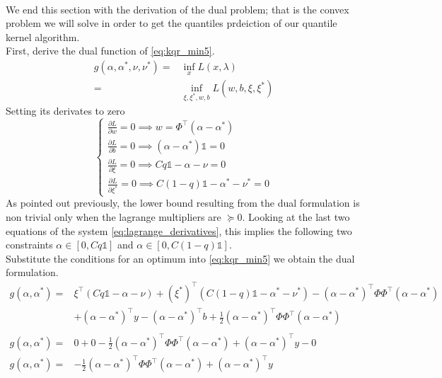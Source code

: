 \\
We end this section with the derivation of the dual problem; that is the convex problem we will solve in order to get the quantiles prdeiction of our quantile kernel algorithm.
\\
First, derive the dual function of \ref{eq:kqr_min5}.
\begin{equation}
    \begin{aligned}
        g(\alpha, \alpha^*, \nu, \nu^*)=& \inf_x L(x,\lambda)\\
    = & \inf_{\xi, \xi^*, w, b} L(w,b,\xi,\xi^*)
\end{aligned}
\end{equation}
Setting its derivates to zero
\begin{equation}\label{eq:lagrange_derivatives}
    \begin{cases}
        \frac{\partial L}{\partial w}=0 \implies w=\Phi^\intercal(\alpha-\alpha^*)
        \\
        \frac{\partial L}{\partial b}=0 \implies (\alpha-\alpha^*)\mathbb{1}=0
        \\
        \frac{\partial L}{\partial \xi}=0 \implies Cq \mathbb{1}-\alpha- \nu=0
        \\
        \frac{\partial L}{\partial \xi^*}=0 \implies C(1-q)\mathbb{1} -\alpha^* -\nu^*=0
    \end{cases}
\end{equation}
As pointed out previously, the lower bound resulting from the dual formulation is non trivial only when the lagrange multipliers are $\succeq 0$. Looking at the last two equations of the system \ref{eq:lagrange_derivatives}, this implies the following two constraints $\alpha \in [0, Cq\mathbb{1}]$ and $\alpha \in [0, C(1-q)\mathbb{1}]$.
\\
Substitute the conditions for an optimum into \ref{eq:kqr_min5} we obtain the dual formulation.
\begin{equation}
    \begin{aligned}
        g(\alpha, \alpha^*)=& \xi^\intercal(Cq\mathbb{1}-\alpha -\nu)+(\xi^*)^\intercal(C(1-q)\mathbb{1}-\alpha^*-\nu^*)-(\alpha-\alpha^*)^\intercal \Phi\Phi^\intercal(\alpha-\alpha^*)
        \\
        & +(\alpha-\alpha^*)^\intercal y-(\alpha-\alpha^*)^\intercal b+\frac{1}{2}(\alpha-\alpha^*)^\intercal \Phi\Phi^\intercal(\alpha-\alpha^*)
        \\
        \\
        g(\alpha, \alpha^*)=& 0+0-\frac{1}{2}(\alpha-\alpha^*)^\intercal \Phi\Phi^\intercal(\alpha-\alpha^*)+(\alpha-\alpha^*)^\intercal y-0
        \\
        g(\alpha, \alpha^*)=& -\frac{1}{2}(\alpha-\alpha^*)^\intercal \Phi\Phi^\intercal(\alpha-\alpha^*)+(\alpha-\alpha^*)^\intercal y
    \end{aligned}
\end{equation}
